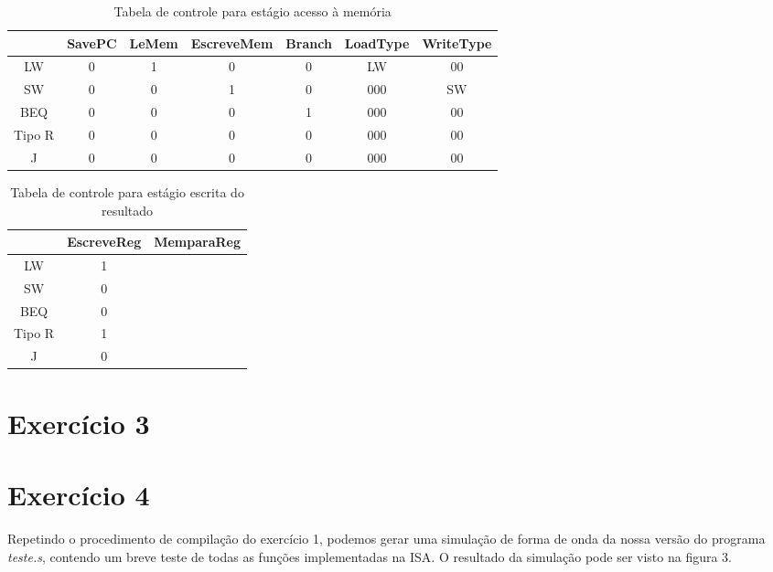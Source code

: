 \documentclass[12pt, a4paper, twoside]{article}
\begin{document}
\begin{table}[H]
    \centering
    \begin{tabular}{|ccccccc|}
    \hline
      & SavePC & LeMem & EscreveMem & Branch & LoadType & WriteType\\
    \hline
     LW     & 0 & 1 & 0 & 0 & LW & 00 \\
     SW     & 0 & 0 & 1 & 0 & 000 & SW \\
     BEQ    & 0 & 0 & 0 & 1 & 000 & 00 \\
     Tipo R & 0 & 0 & 0 & 0 & 000 & 00 \\
     J      & 0 & 0 & 0 & 0 & 000 & 00 \\

    \hline
    \end{tabular}
    \caption{Tabela de controle para estágio acesso à memória}
\end{table}

\begin{table}[H]
    \centering
    \begin{tabular}{|ccc|}
    \hline
      & EscreveReg & MemparaReg \\
    \hline
    LW      & 1 & \\
    SW      & 0 & \\
    BEQ     & 0 & \\
    Tipo R  & 1 & \\
    J       & 0 & \\
    \hline
    \end{tabular}
    \caption{Tabela de controle para estágio escrita do resultado}
\end{table}

\section{Exercício 3}


\section{Exercício 4}

Repetindo o procedimento de compilação do exercício 1, podemos gerar uma simulação de forma de onda da nossa versão do programa \textit{teste.s}, contendo um breve teste de todas as funções implementadas na ISA. O resultado da simulação pode ser visto na figura 3.
\end{document}
